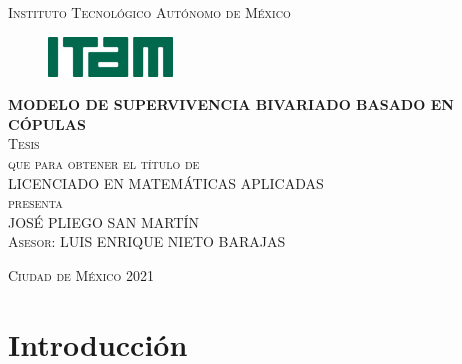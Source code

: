 \documentclass[11pt,a4paper]{article}
\begin{document}
\begin{titlepage}
\begin{center}

\textsc{\Large Instituto Tecnológico Autónomo de México}\\[4em]

\begin{figure}[h]
\begin{center}
\includegraphics{logo-ITAM_ch.jpg}
\end{center}
\end{figure}

\vspace{4em}

\textsc{\LARGE \textbf{MODELO DE SUPERVIVENCIA BIVARIADO BASADO EN CÓPULAS}}\\[4em]

\textsc{\large Tesis}\\[1em]

\textsc{que para obtener el título de}\\[1em]

\textsc{LICENCIADO EN MATEMÁTICAS APLICADAS}\\[1em]

\textsc{presenta}\\[1em]

\textsc{\Large JOSÉ PLIEGO SAN MARTÍN}\\[1em]

\textsc{\large Asesor: LUIS ENRIQUE NIETO BARAJAS}

\end{center}

\vspace*{\fill}
\textsc{Ciudad de México \hspace*{\fill} 2021}

\end{titlepage}

\tableofcontents
\listoffigures
\listoftables

\newpage

\setlength{\parskip}{\baselineskip}

\section{Introducción}
\label{intro}
\end{document}
